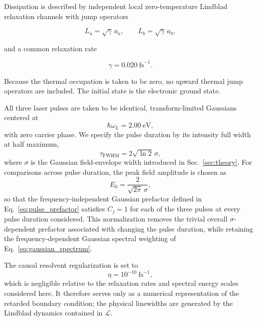 Dissipation is described by independent local zero-temperature
Lindblad relaxation channels with jump operators

\begin{equation}
L_a=\sqrt{\gamma}\,a_a,
\qquad
L_b=\sqrt{\gamma}\,a_b,
\end{equation}

and a common relaxation rate

\begin{equation}
\gamma = 0.020~\mathrm{fs}^{-1}.
\end{equation}

Because the thermal occupation is taken to be zero, no upward thermal
jump operators are included. The initial state is the electronic
ground state.

All three laser pulses are taken to be identical, transform-limited
Gaussians centered at
%
\begin{equation}
\hbar\omega_L = 2.00~\mathrm{eV},
\end{equation}
%
with zero carrier phase.
We specify the pulse duration by its intensity full width at half
maximum,
%
\begin{equation}
\tau_{\mathrm{FWHM}}
=
2\sqrt{\ln 2}\,\sigma ,
\label{eq:intensity_fwhm}
\end{equation}
%
where $\sigma$ is the Gaussian field-envelope width introduced in
Sec.~\ref{sec:theory}.
For comparisons across pulse duration, the peak field amplitude is
chosen as
%
\begin{equation}
E_0
=
\frac{2}{\sqrt{2\pi}\,\sigma},
\label{eq:dimer_pulse_normalization}
\end{equation}
%
so that the frequency-independent Gaussian prefactor defined in
Eq.~\eqref{eq:pulse_prefactor} satisfies $C_j=1$ for each of the
three pulses at every pulse duration considered.
This normalization removes the trivial overall
$\sigma$-dependent prefactor associated with changing the pulse
duration, while retaining the frequency-dependent Gaussian spectral
weighting of Eq.~\eqref{eq:gaussian_spectrum}.

The causal resolvent regularization is set to
%
\begin{equation}
\eta = 10^{-10}~\mathrm{fs}^{-1},
\end{equation}
%
which is negligible relative to the relaxation rates and spectral
energy scales considered here. It therefore serves only as a numerical
representation of the retarded boundary condition; the physical
linewidths are generated by the Lindblad dynamics contained in
$\mathcal{L}$.

